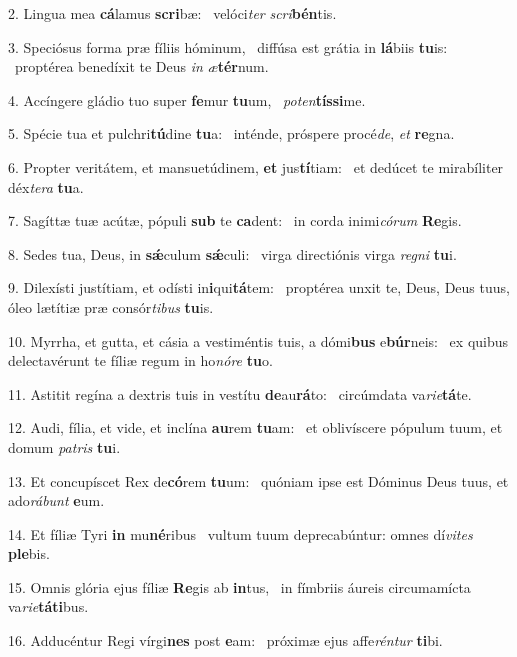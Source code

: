 2. Lingua mea \textbf{cá}lamus \textbf{scri}bæ: \ast\  velóci\textit{ter} \textit{scri}\textbf{bén}tis.\

3. Speciósus forma præ fíliis hóminum, \dag\  diffúsa est grátia in \textbf{lá}biis \textbf{tu}is: \ast\  proptérea benedíxit te Deus \textit{in} \textit{æ}\textbf{tér}num.\

4. Accíngere gládio tuo super \textbf{fe}mur \textbf{tu}um, \ast\  \textit{pot}\textit{en}\textbf{tís}\textbf{si}me.\

5. Spécie tua et pulchri\textbf{tú}dine \textbf{tu}a: \ast\  inténde, próspere procé\textit{de}, \textit{et} \textbf{re}gna.\

6. Propter veritátem, et mansuetúdinem, \textbf{et} jus\textbf{tí}tiam: \ast\  et dedúcet te mirabíliter déx\textit{te}\textit{ra} \textbf{tu}a.\

7. Sagíttæ tuæ acútæ, pópuli \textbf{sub} te \textbf{ca}dent: \ast\  in corda inimi\textit{có}\textit{rum} \textbf{Re}gis.\

8. Sedes tua, Deus, in \textbf{sǽ}culum \textbf{sǽ}culi: \ast\  virga directiónis virga \textit{re}\textit{gni} \textbf{tu}i.\

9. Dilexísti justítiam, et odísti in\textbf{i}qui\textbf{tá}tem: \ast\  proptérea unxit te, Deus, Deus tuus, óleo lætítiæ præ consór\textit{ti}\textit{bus} \textbf{tu}is.\

10. Myrrha, et gutta, et cásia a vestiméntis tuis, a dómi\textbf{bus} e\textbf{búr}neis: \ast\  ex quibus delectavérunt te fíliæ regum in ho\textit{nó}\textit{re} \textbf{tu}o.\

11. Astitit regína a dextris tuis in vestítu \textbf{de}au\textbf{rá}to: \ast\  circúmdata va\textit{ri}\textit{e}\textbf{tá}te.\

12. Audi, fília, et vide, et inclína \textbf{au}rem \textbf{tu}am: \ast\  et oblivíscere pópulum tuum, et domum \textit{pa}\textit{tris} \textbf{tu}i.\

13. Et concupíscet Rex de\textbf{có}rem \textbf{tu}um: \ast\  quóniam ipse est Dóminus Deus tuus, et ado\textit{rá}\textit{bunt} \textbf{e}um.\

14. Et fíliæ Tyri \textbf{in} mu\textbf{né}ribus \ast\  vultum tuum deprecabúntur: omnes dí\textit{vi}\textit{tes} \textbf{ple}bis.\

15. Omnis glória ejus fíliæ \textbf{Re}gis ab \textbf{in}tus, \ast\  in fímbriis áureis circumamícta va\textit{ri}\textit{e}\textbf{tá}\textbf{ti}bus.\

16. Adducéntur Regi vírgi\textbf{nes} post \textbf{e}am: \ast\  próximæ ejus affe\textit{rén}\textit{tur} \textbf{ti}bi.\

